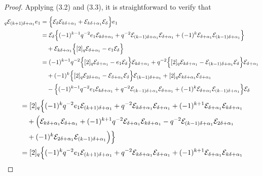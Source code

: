 \documentclass[12pt]{amsart}
\numberwithin{equation}{section}
\numberwithin{equation}{section}
\begin{document}
\begin{proof}
Applying (3.2) and (3.3), it is straightforward to verify that
\begin{align*}
[2]_q\mathcal{E}_{(k+1)\delta+\alpha_{1}}e_{1} &=\Bigl\{\mathcal{E}_{\delta}\mathcal{E}_{k\delta+\alpha_{1}} + \mathcal{E}_{k\delta+\alpha_{1}}\mathcal{E}_{\delta}\Bigr\}e_{1}\\
&=\mathcal{E}_{\delta}\Bigl\{(-1)^{k-1} q^{-2}e_1\mathcal{E}_{k\delta+\alpha_{1}}+q^{-2}\mathcal{E}_{(k-1)\delta+\alpha_{1}}\mathcal{E}_{\delta+\alpha_{1}}+(-1)^k\mathcal{E}_{\delta+\alpha_{1}}\mathcal{E}_{(k-1)\delta+\alpha_{1}}\Bigr\}\\
&\quad+\mathcal{E}_{k\delta+\alpha_{1}}\Bigl\{[2]_q\mathcal{E}_{\delta+\alpha_{1}} -e_1\mathcal{E}_{\delta}\Bigr\}\\
&=(-1)^{k-1} q^{-2}\Bigl\{[2]_q\mathcal{E}_{\delta+\alpha_{1}} -e_1\mathcal{E}_{\delta}\Bigr\}\mathcal{E}_{k\delta+\alpha_{1}}+q^{-2}\Bigl\{ [2]_q\mathcal{E}_{k\delta+\alpha_{1}}-\mathcal{E}_{(k-1)\delta+\alpha_{1}}\mathcal{E}_{\delta}\Bigr\}\mathcal{E}_{\delta+\alpha_{1}}
\\
&\quad+(-1)^k\Bigl\{[2]_q\mathcal{E}_{2\delta+\alpha_{1}}-\mathcal{E}_{\delta+\alpha_{1}}\mathcal{E}_{\delta}\Bigr\}\mathcal{E}_{(k-1)\delta+\alpha_{1}}+[2]_q\mathcal{E}_{k\delta+\alpha_{1}} \mathcal{E}_{\delta+\alpha_{1}}
\\
&\quad-\Bigl\{(-1)^{k-1} q^{-2}e_1\mathcal{E}_{k\delta+\alpha_{1}}+q^{-2}\mathcal{E}_{(k-1)\delta+\alpha_{1}}\mathcal{E}_{\delta+\alpha_{1}}+(-1)^k\mathcal{E}_{\delta+\alpha_{1}}\mathcal{E}_{(k-1)\delta+\alpha_{1}}\Bigr\}\mathcal{E}_{\delta}
\end{align*}
\begin{align*}
&=[2]_q\Bigl\{(-1)^{k}q^{-2}e_{1}\mathcal{E}_{(k+1)\delta+\alpha_{1}}+q^{-2}\mathcal{E}_{k\delta+\alpha_{1}}\mathcal{E}_{\delta+\alpha_{1}}+(-1)^{k+1}\mathcal{E}_{\delta+\alpha_{1}}\mathcal{E}_{k\delta+\alpha_{1}}\\
&\quad+\Bigl(\mathcal{E}_{k\delta+\alpha_{1}}\mathcal{E}_{\delta+\alpha_1}+(-1)^{k+1}q^{-2}\mathcal{E}_{\delta+\alpha_1}\mathcal{E}_{k\delta+\alpha_{1}}-q^{-2}\mathcal{E}_{(k-1)\delta+\alpha_{1}}\mathcal{E}_{2\delta+\alpha_{1}}\\
&\quad+(-1)^{k}\mathcal{E}_{2\delta+\alpha_{1}}\mathcal{E}_{(k-1)\delta+\alpha_{1}}\Bigr)\Bigr\}\\
&=[2]_q\Bigl\{(-1)^{k}q^{-2}e_{1}\mathcal{E}_{(k+1)\delta+\alpha_{1}}+q^{-2}\mathcal{E}_{k\delta+\alpha_{1}}\mathcal{E}_{\delta+\alpha_{1}}+(-1)^{k+1}\mathcal{E}_{\delta+\alpha_{1}}\mathcal{E}_{k\delta+\alpha_{1}}\\

\end{align*}
\end{proof}
\end{document}
